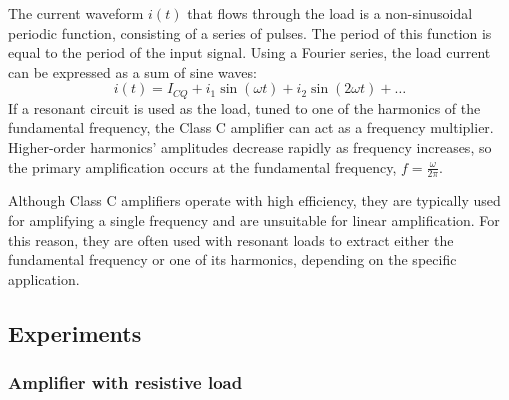 \documentclass[12pt,a4paper]{article}
\begin{document}
The current waveform \( i(t) \) that flows through the load is a non-sinusoidal periodic function, consisting of a series of pulses. The period of this function is equal to the period of the input signal. Using a Fourier series, the load current can be expressed as a sum of sine waves:
\[
i(t) = I_{CQ} + i_1 \sin(\omega t) + i_2 \sin(2 \omega t) + \dots
\]
If a resonant circuit is used as the load, tuned to one of the harmonics of the fundamental frequency, the Class C amplifier can act as a frequency multiplier. Higher-order harmonics' amplitudes decrease rapidly as frequency increases, so the primary amplification occurs at the fundamental frequency, \( f = \frac{\omega}{2 \pi} \).

Although Class C amplifiers operate with high efficiency, they are typically used for amplifying a single frequency and are unsuitable for linear amplification. For this reason, they are often used with resonant loads to extract either the fundamental frequency or one of its harmonics, depending on the specific application.

    \subsection{Experiments}
    \subsubsection{Amplifier with resistive load}
\end{document}

